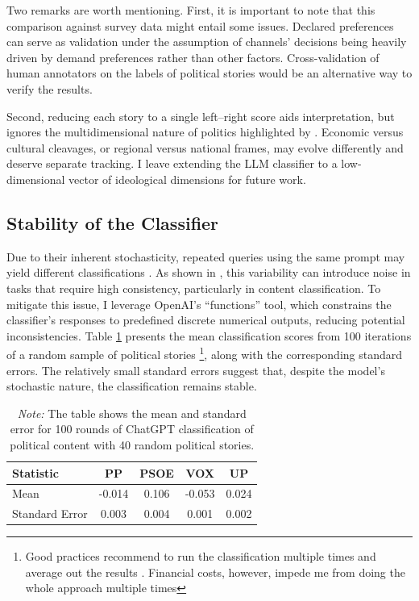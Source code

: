\documentclass[12pt]{article}
\begin{document}
Two remarks are worth mentioning. First, it is important to note that this comparison against survey data might entail some issues. Declared preferences can serve as validation under the assumption of channels' decisions being heavily driven by demand preferences rather than other factors. Cross-validation of human annotators on the labels of political stories would be an alternative way to verify the results. 

Second, reducing each story to a single left–right score aids interpretation, but ignores the multidimensional nature of politics highlighted by \citet{puglisi2011newspapers}. Economic versus cultural cleavages, or regional versus national frames, may evolve differently and deserve separate tracking. I leave extending the LLM classifier to a low-dimensional vector of ideological dimensions for future work.




\subsection{Stability of the Classifier}


Due to their inherent stochasticity, repeated queries using the same prompt may yield different classifications \citep{llmstability2024}. As shown in \citep{llmclassification2024}, this variability can introduce noise in tasks that require high consistency, particularly in content classification. To mitigate this issue, I leverage OpenAI’s “functions” tool, which constrains the classifier’s responses to predefined discrete numerical outputs, reducing potential inconsistencies. Table \ref{tab:table_stability} presents the mean classification scores from 100 iterations of a random sample of political stories \footnote{Good practices recommend to run the classification multiple times and average out the results \citep{tornberg2023}. Financial costs, however, impede me from doing the whole approach multiple times}, along with the corresponding standard errors. The relatively small standard errors suggest that, despite the model’s stochastic nature, the classification remains stable.





\begin{table}[!htb]
	\centering
	\caption{Mean and Standard Error for 100 Rounds of ChatGPT Classification}
	\begin{tabular}{|l|c|c|c|c|}
		\hline
		\textbf{Statistic} & \textbf{PP} & \textbf{PSOE} & \textbf{VOX} & \textbf{UP} \\
		\hline
		Mean & -0.014 & 0.106 & -0.053 & 0.024 \\
		Standard Error & 0.003 & 0.004 & 0.001 & 0.002 \\
		\hline
	\end{tabular}
	\caption*{\small \textit{Note:}  The table shows the mean and standard error for 100 rounds of ChatGPT classification of political content with 40 random political stories.}
	\label{tab:table_stability}
\end{table}
\end{document}
